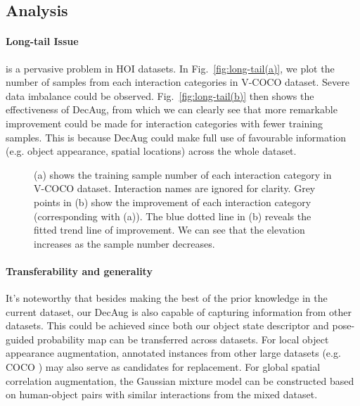 \documentclass[10pt,twocolumn,letterpaper]{article}
\begin{document}
\subsection{Analysis}
\paragraph{Long-tail Issue}
is a pervasive problem in HOI datasets. In Fig.~\ref{fig:long-tail(a)}, we plot the number of samples from each interaction categories in V-COCO dataset. Severe data imbalance could be observed.  Fig.~\ref{fig:long-tail(b)} then shows the effectiveness of DecAug, from which we can clearly see that more remarkable improvement could be made for interaction categories with fewer training samples. This is because DecAug could make full use of favourable information (e.g. object appearance, spatial locations) across the whole dataset.

\begin{figure}[t]
\centering

\caption{(a) shows the training sample number of each interaction category in V-COCO dataset. Interaction names are ignored for clarity. Grey points in (b) show the  improvement of each interaction category (corresponding with (a)). The blue dotted line in (b) reveals the fitted trend line of  improvement. We can see that the elevation increases as the sample number decreases.}
\label{fig:long-tail}
\end{figure}


\paragraph{Transferability and generality}




It's noteworthy that besides making the best of the prior knowledge in the current dataset, our DecAug is also capable of capturing information from other datasets. This could be achieved since both our object state descriptor and pose-guided probability map can be transferred across datasets. For local object appearance augmentation, annotated instances from other large datasets (e.g. COCO \cite{lin2014microsoft}) may also serve as candidates for replacement.
For global spatial correlation augmentation, the Gaussian mixture model can be constructed based on human-object pairs with similar interactions from the mixed dataset.
\end{document}
